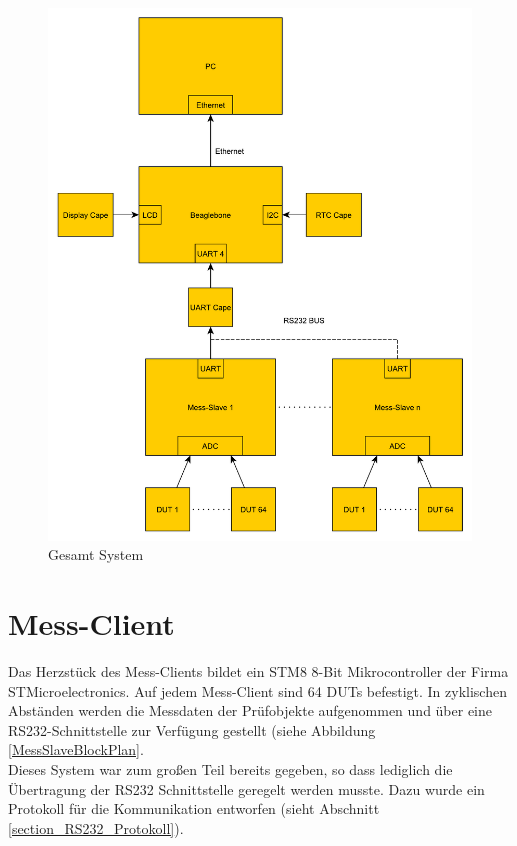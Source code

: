 \begin{figure}[H]
\begin{center}
\includegraphics[width=\textwidth]{img/general/BlockPlan.pdf}
\caption{Gesamt System}
\label{Gesamt_System}
\end{center}
\end{figure}


\section{Mess-Client}
\label{section_Mess-Client}

Das Herzstück des Mess-Clients bildet ein STM8  8-Bit Mikrocontroller der Firma STMicroelectronics.
Auf jedem Mess-Client sind 64 \acp{DUT} befestigt. In zyklischen Abständen werden die Messdaten der Prüfobjekte aufgenommen und über eine RS232-Schnittstelle zur Verfügung gestellt (siehe Abbildung \ref{MessSlaveBlockPlan}.\\
Dieses System war zum großen Teil bereits gegeben, so dass lediglich die Übertragung der RS232 Schnittstelle geregelt werden musste. Dazu wurde ein Protokoll für die Kommunikation entworfen (sieht Abschnitt \ref{section_RS232_Protokoll}).
 

